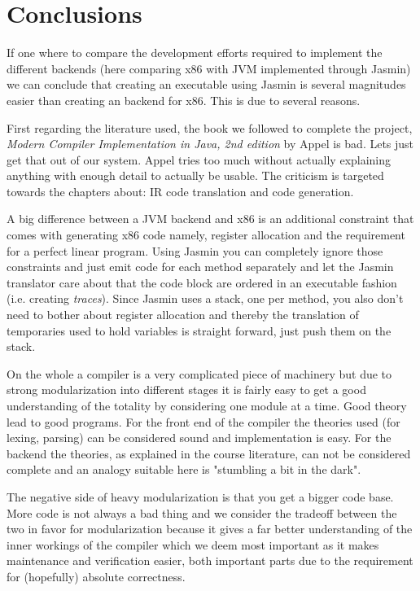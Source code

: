 \documentclass[11pt]{amsart}
\begin{document}
\section{Conclusions}
If one where to compare the development efforts required to implement the different backends (here comparing x86 with JVM implemented through Jasmin) we can conclude that creating an executable using Jasmin is several magnitudes easier than creating an backend for x86. This is due to several reasons.

First regarding the literature used, the book we followed to complete the project, \textit{Modern Compiler Implementation in Java, 2nd edition} by Appel\cite{appel} is bad. Lets just get that out of our system. Appel tries too much without actually explaining anything with enough detail to actually be usable. The criticism is targeted towards the chapters about: IR code translation and code generation.

A big difference between a JVM backend and x86 is an additional constraint that comes with generating x86 code namely, register allocation and the requirement for a perfect linear program. Using Jasmin you can completely ignore those constraints and just emit code for each method separately and let the Jasmin translator care about that the code block are ordered in an executable fashion (i.e. creating \textit{traces}). Since Jasmin uses a stack, one per method, you also don't need to bother about register allocation and thereby the translation of temporaries used to hold variables is straight forward, just push them on the stack.

On the whole a compiler is a very complicated piece of machinery but due to strong modularization into different stages it is fairly easy to get a good understanding of the totality by considering one module at a time. Good theory lead to good programs. For the front end of the compiler the theories used (for lexing, parsing) can be considered sound and implementation is easy. For the backend the theories, as explained in the course literature, can not be considered complete and an analogy suitable here is "stumbling a bit in the dark".

The negative side of heavy modularization is that you get a bigger code base. More code is not always a bad thing and we consider the tradeoff between the two in favor for modularization because it gives a far better understanding of the inner workings of the compiler which we deem most important as it makes maintenance and verification easier, both important parts due to the requirement for (hopefully) absolute correctness.
\end{document}
